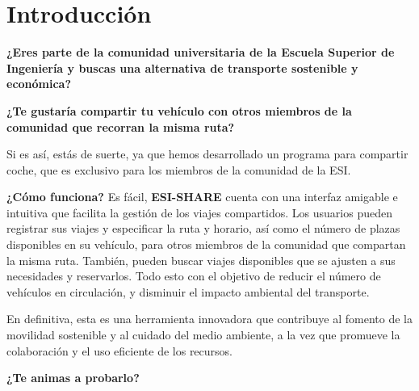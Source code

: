 

\section{Introducción}

\begin{center}
\textbf{¿Eres parte de la comunidad universitaria de la Escuela Superior de Ingeniería y buscas una alternativa de transporte sostenible y económica?}\\
\end{center}
\begin{center}
\textbf{¿Te gustaría compartir tu vehículo con otros miembros de la comunidad que recorran la misma ruta?}\\
\end{center}
Si es así, estás de suerte, ya que hemos desarrollado un programa para compartir coche, que es exclusivo para los miembros de la comunidad de la ESI.

\bigskip

\textbf{¿Cómo funciona?} Es fácil, \textbf{ESI-SHARE} cuenta con una interfaz amigable e intuitiva que facilita la gestión de los viajes compartidos.  Los usuarios pueden registrar sus
viajes y especificar la ruta y horario, así como el número de plazas disponibles en su vehículo, para otros miembros de la comunidad que compartan la misma ruta.
También, pueden buscar viajes disponibles que se ajusten a sus necesidades y reservarlos. Todo esto con el objetivo de reducir el número de vehículos en circulación,
y disminuir el impacto ambiental del transporte.

\bigskip

En definitiva, esta es una herramienta innovadora que contribuye al fomento de la movilidad sostenible y al cuidado del medio ambiente, a la vez que
promueve la colaboración y el uso eficiente de los recursos.
\bigskip
\begin{center}
\textbf{¿Te animas a probarlo?}
\end{center}